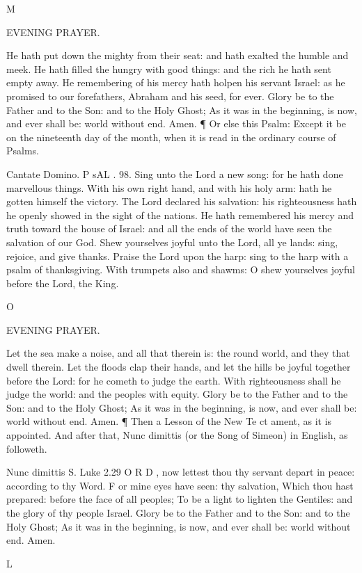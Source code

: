 M

EVENING PRAYER.

He hath put down the mighty from their seat: and hath exalted the humble and meek. He hath filled the hungry with good things: and the rich he hath sent empty away. He remembering of his mercy hath holpen his servant Israel: as he promised to our forefathers, Abraham and his seed, for ever. Glory be to the Father and to the Son: and to the Holy Ghost; As it was in the beginning, is now, and ever shall be: world without end. Amen. ¶ Or else this Psalm: Except it be on the nineteenth day of the month, when it is read in the ordinary course of Psalms.

Cantate Domino. P sAL . 98. Sing unto the Lord a new song: for he hath done marvellous things. With his own right hand, and with his holy arm: hath he gotten himself the victory. The Lord declared his salvation: his righteousness hath he openly showed in the sight of the nations. He hath remembered his mercy and truth toward the house of Israel: and all the ends of the world have seen the salvation of our God. Shew yourselves joyful unto the Lord, all ye lands: sing, rejoice, and give thanks. Praise the Lord upon the harp: sing to the harp with a psalm of thanksgiving. With trumpets also and shawms: O shew yourselves joyful before the Lord, the King.

O

EVENING PRAYER.

Let the sea make a noise, and all that therein is: the round world, and they that dwell therein. Let the floods clap their hands, and let the hills be joyful together before the Lord: for he cometh to judge the earth. With righteousness shall he judge the world: and the peoples with equity. Glory be to the Father and to the Son: and to the Holy Ghost; As it was in the beginning, is now, and ever shall be: world without end. Amen. ¶ Then a Lesson of the New Te ct ament, as it is appointed. And after that, Nunc dimittis (or the Song of Simeon) in English, as followeth.

Nunc dimittis S. Luke 2.29 O R D , now lettest thou thy servant depart in peace: according to thy Word. F or mine eyes have seen: thy salvation, Which thou hast prepared: before the face of all peoples; To be a light to lighten the Gentiles: and the glory of thy people Israel. Glory be to the Father and to the Son: and to the Holy Ghost; As it was in the beginning, is now, and ever shall be: world without end. Amen.

L

